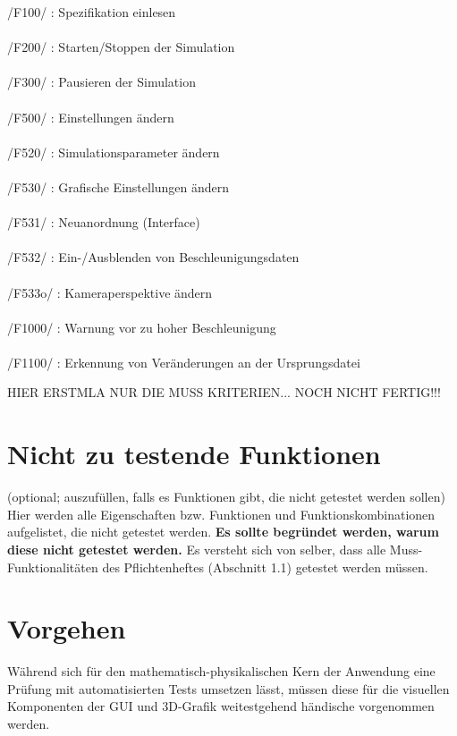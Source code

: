 /F100/ : Spezifikation einlesen\\
\\
/F200/ : Starten/Stoppen der Simulation\\
\\
/F300/ : Pausieren der Simulation\\
\\
/F500/ : Einstellungen ändern\\
\\
/F520/ : Simulationsparameter ändern\\
\\
/F530/ : Grafische Einstellungen ändern\\
\\
/F531/ : Neuanordnung (Interface)\\
\\
/F532/ : Ein-/Ausblenden von Beschleunigungsdaten\\
\\
/F533o/ : Kameraperspektive ändern\\
\\
/F1000/ : Warnung vor zu hoher Beschleunigung\\
\\
/F1100/ : Erkennung von Veränderungen an der Ursprungsdatei



HIER ERSTMLA NUR DIE MUSS KRITERIEN... NOCH NICHT FERTIG!!!

\section{Nicht zu testende Funktionen}
(optional; auszufüllen, falls es Funktionen gibt, die nicht getestet werden
sollen)\\

Hier werden alle Eigenschaften bzw. Funktionen und Funktionskombinationen
aufgelistet, die nicht getestet werden.
\textbf{ Es sollte begründet werden, warum diese nicht getestet werden.} Es
versteht sich von selber, dass alle Muss-Funktionalitäten des Pflichtenheftes
(Abschnitt 1.1) getestet werden müssen.

\section{Vorgehen}

Während sich für den mathematisch-physikalischen Kern der Anwendung eine Prüfung mit automatisierten Tests umsetzen lässt, müssen diese für die visuellen Komponenten der GUI und 3D-Grafik weitestgehend händische vorgenommen werden.

